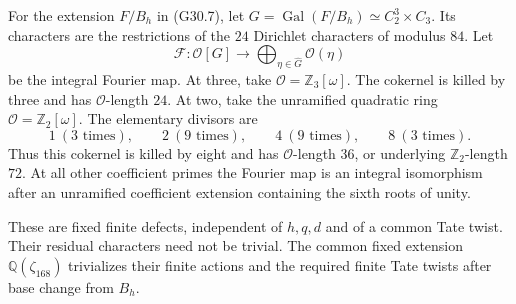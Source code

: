 \begin{proposition}
\label{AC-G30-Fourier}
For the extension $F/B_h$ in (G30.7), let
$G=\operatorname{Gal}(F/B_h)\simeq C_2^3\times C_3$.
Its characters are the restrictions of the $24$ Dirichlet
characters of modulus $84$.  Let
\[
 \mathcal F:\mathcal O[G]\longrightarrow
       \bigoplus_{\eta\in\widehat G}\mathcal O(\eta)
\]
be the integral Fourier map.
At three, take $\mathcal O=\mathbb Z_3[\omega]$.
The cokernel is killed by three and has
$\mathcal O$-length $24$.
At two, take the unramified quadratic ring
$\mathcal O=\mathbb Z_2[\omega]$.
The elementary divisors are
\[
 1\ (3\text{ times}),\qquad
 2\ (9\text{ times}),\qquad
 4\ (9\text{ times}),\qquad
 8\ (3\text{ times}).                                \tag{G30.8}
\]
Thus this cokernel is killed by eight and has
$\mathcal O$-length $36$, or underlying
$\mathbb Z_2$-length $72$.
At all other coefficient primes the Fourier map is an
integral isomorphism after an unramified coefficient
extension containing the sixth roots of unity.

These are fixed finite defects, independent of $h,q,d$
and of a common Tate twist.  Their residual characters
need not be trivial.  The common fixed extension
$\mathbb Q(\zeta_{168})$ trivializes their finite actions
and the required finite Tate twists after base change
from $B_h$.
\end{proposition}
